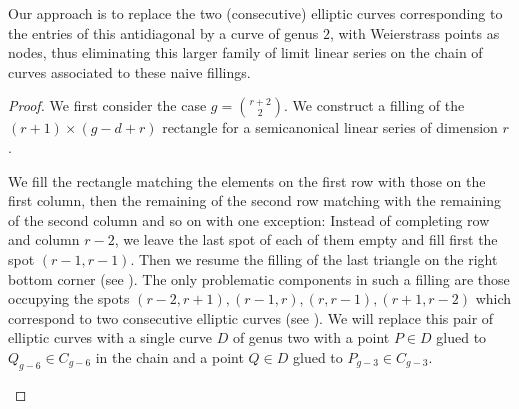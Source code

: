 \documentclass[11pt]{amsart}
\newtheorem{theorem}{Theorem}[section]
\theoremstyle{definition}
\theoremstyle{definition}
\begin{document}
Our approach is to replace the two (consecutive) elliptic curves corresponding to the entries of this antidiagonal by a curve of genus $2$, 
with Weierstrass points as nodes, thus eliminating this larger family of limit linear series on the chain of curves associated to these naive fillings.

\begin{proof}  We first consider the case  $g= {r+2\choose 2}$.
We construct a filling of the $(r+1)\times(g-d+r)$ rectangle for a semicanonical linear series of dimension $r$.
	
We fill the rectangle matching the elements on the first row with those on the first column, then the remaining of the second row matching with the remaining of the second column 
and so on  with one exception:
Instead of completing row and column $r-2$, we leave the last spot of each of them empty and fill first the spot $(r-1,r-1)$.
 Then we  resume the filling of the last triangle on the right bottom corner (see ).
The only problematic components in such a filling are those occupying the spots $(r-2,r+1), (r-1, r), (r,r-1), (r+1,r-2)$ which correspond to two consecutive elliptic curves (see ).
We will replace this pair of elliptic curves with a single curve $D$ of genus two with a point  $P\in D$ glued to $Q_{g-6}\in C_{g-6}$ in the chain 
and  a point $Q\in D$ glued to  $P_{g-3}\in C_{g-3}$.

\begin{figure}[h!]
\end{figure}
\end{proof}
\end{document}

